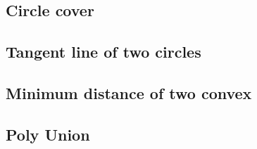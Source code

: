 \documentclass[a4paper,10pt,twocolumn,oneside]{article}
\begin{document}
%

%

\subsection{Circle cover}


%

\subsection{Tangent line of two circles}



\subsection{Minimum distance of two convex}


%
%

\subsection{Poly Union}


%
\end{document}
